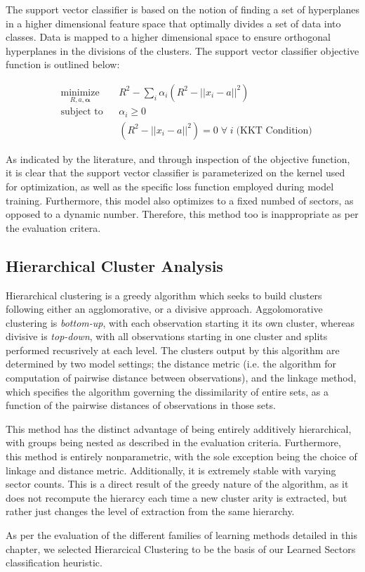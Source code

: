 \documentclass[../main.tex]{subfiles}
\begin{document}
The support vector classifier is based on the notion of finding a set of hyperplanes in a higher dimensional feature space that optimally divides a set of data into classes. Data is mapped to a higher dimensional space to ensure orthogonal hyperplanes in the divisions of the clusters. The support vector classifier objective function is outlined below:

\begin{equation*}
    \begin{aligned}
        & \underset{R, a, \boldsymbol{\alpha}}{\text{minimize}} & & R^2 - \sum_i \alpha_i (R^2 - ||x_i - a||^2) \\
        & \text{subject to}
        & & \alpha_i \geq 0 \\
        & & & (R^2 - ||x_i - a||^2) = 0 \; \forall \; i \; \text{(KKT Condition)}
    \end{aligned}
\end{equation*}

As indicated by the literature, and through inspection of the objective function, it is clear that the support vector classifier is parameterized on the kernel used for optimization, as well as the specific loss function employed during model training. Furthermore, this model also optimizes to a fixed numbed of sectors, as opposed to a dynamic number. Therefore, this method too is inappropriate as per the evaluation critera.

\subsection{Hierarchical Cluster Analysis} \label{learning_methods_survey:hca}

Hierarchical clustering is a greedy algorithm which seeks to build clusters following either an agglomorative, or a divisive approach. Aggolomorative clustering is \textit{bottom-up}, with each observation starting it its own cluster, whereas divisive is \textit{top-down}, with all observations starting in one cluster and splits performed recusrively at each level. The clusters output by this algorithm are determined by two model settings; the distance metric (i.e. the algorithm for computation of pairwise distance between observations), and the linkage method, which specifies the algorithm governing the dissimilarity of entire sets, as a function of the pairwise distances of observations in those sets.

This method has the distinct advantage of being entirely additively hierarchical, with groups being nested as described in the evaluation criteria. Furthermore, this method is entirely nonparametric, with the sole exception being the choice of linkage and distance metric. Additionally, it is extremely stable with varying sector counts. This is a direct result of the greedy nature of the algorithm, as it does not recompute the hierarcy each time a new cluster arity is extracted, but rather just changes the level of extraction from the same hierarchy.

As per the evaluation of the different families of learning methods detailed in this chapter, we selected Hierarcical Clustering to be the basis of our Learned Sectors classification heuristic.
\end{document}
